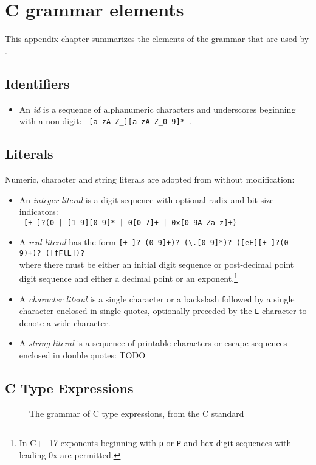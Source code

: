 \section{C grammar elements}
\label{sec:cgrammar}

This appendix chapter summarizes the elements of the \lang grammar that are used by \NAME.

\subsection{Identifiers}

\begin{itemize}
  \item  An \textit{id} is a sequence of alphanumeric characters and underscores beginning with a non-digit:  \lstinline| [a-zA-Z_][a-zA-Z_0-9]* |.
\end{itemize}

\subsection{Literals}

Numeric, character and string literals are adopted from \lang without modification:
\begin{itemize}
  \item An \textit{integer literal} is a digit sequence with optional radix and bit-size indicators: \\ \lstinline! [+-]?(0 | [1-9][0-9]* | 0[0-7]+ | 0x[0-9A-Za-z]+) !
  \item A \textit{real literal} has the form \lstinline![+-]? (0-9]+)? (\.[0-9]*)? ([eE][+-]?(0-9)+)? ([fFlL])? ! \\where there must be either an initial digit sequence or post-decimal point digit sequence and either a decimal point or an exponent.\footnote{In C++17 exponents beginning with \lstinline|p| or \lstinline|P| and hex digit sequences with leading 0x are permitted.}
  \item A \textit{character literal} is a single character or a backslash followed by a single character enclosed in single quotes, optionally 
  preceded by the \lstinline|L| character to denote a wide character.
  \item A \textit{string literal} is a sequence of printable characters or escape sequences enclosed in double quotes: TODO
\end{itemize}


\subsection{C Type Expressions}

\begin{figure}[t]
  \begin{cadre}
    
  \end{cadre}
  \caption{The grammar of C type expressions, from the C standard}
\label{fig:gram:ctype}
\end{figure}



